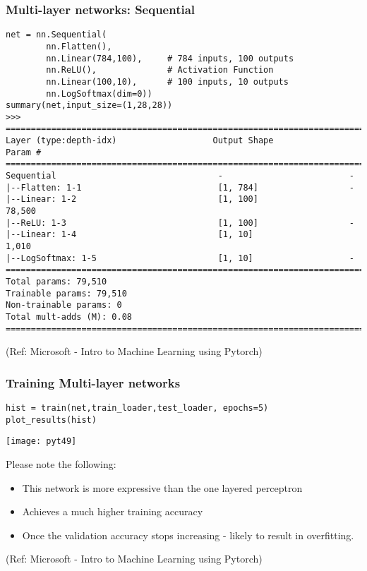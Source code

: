 \begin{frame}[fragile] \frametitle{Multi-layer networks: Sequential}

\begin{lstlisting}
net = nn.Sequential(
        nn.Flatten(), 
        nn.Linear(784,100),     # 784 inputs, 100 outputs
        nn.ReLU(),              # Activation Function
        nn.Linear(100,10),      # 100 inputs, 10 outputs
        nn.LogSoftmax(dim=0))
summary(net,input_size=(1,28,28))
>>>
===========================================================================
Layer (type:depth-idx)                   Output Shape              Param #
===========================================================================
Sequential                                -                         -
|--Flatten: 1-1                           [1, 784]                  -
|--Linear: 1-2                            [1, 100]                  78,500
|--ReLU: 1-3                              [1, 100]                  -
|--Linear: 1-4                            [1, 10]                   1,010
|--LogSoftmax: 1-5                        [1, 10]                   -
===========================================================================
Total params: 79,510
Trainable params: 79,510
Non-trainable params: 0
Total mult-adds (M): 0.08
===========================================================================
\end{lstlisting}


\tiny{(Ref: Microsoft - Intro to Machine Learning using Pytorch)}
\end{frame}


\begin{frame}[fragile] \frametitle{Training Multi-layer networks}

\begin{lstlisting}
hist = train(net,train_loader,test_loader, epochs=5)
plot_results(hist)
\end{lstlisting}

\begin{center}
\texttt{[image: pyt49]}
\end{center}

Please note the following:
\begin{itemize}
\item This network is more expressive than the one layered perceptron
\item Achieves a much higher training accuracy
\item Once the validation accuracy stops increasing - likely to result in overfitting.
\end{itemize}

\tiny{(Ref: Microsoft - Intro to Machine Learning using Pytorch)}
\end{frame}

